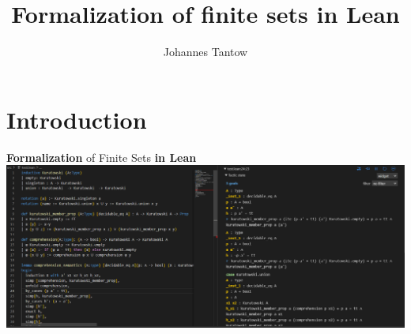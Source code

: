 \documentclass[aspectratio=169]{beamer}
\title[Finite sets]{Formalization of finite sets in Lean}
\author[J. Tantow]{Johannes Tantow}
\begin{document}
    \maketitle
    \section{Introduction}
    \begin{frame}[fragile]{\textbf{Formalization} of Finite Sets \textbf{in Lean}}
        \includegraphics[width=1\textwidth]{Lean_Preview.png}
    \end{frame}
\end{document}
